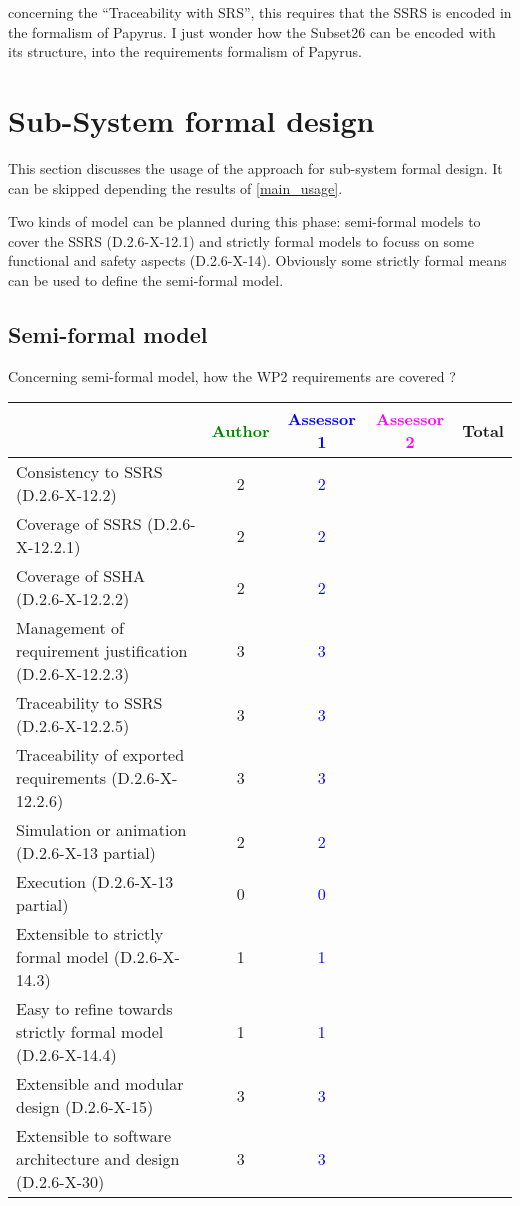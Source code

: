 \begin{assessor1}
concerning the "`Traceability with SRS"', this requires that the SSRS is encoded in the formalism of Papyrus. I just wonder how the Subset26 can be encoded with its structure, into the requirements formalism of Papyrus. 
\end{assessor1}

\section{Sub-System formal design}
This section discusses the usage of the approach for sub-system formal design.
It can be skipped depending the results of \ref{main_usage}.

Two kinds of model can be planned during this phase: semi-formal models to cover the SSRS (D.2.6-X-12.1) and strictly formal models to focuss on some functional and safety aspects (D.2.6-X-14). Obviously some strictly formal means can be used to define the semi-formal model.

\subsection{Semi-formal model}

Concerning semi-formal model, how the WP2 requirements are covered ?

\begin{tabular}{|l | c | c | c | c|}
\hline
& \textcolor{green}{Author} & \textcolor{blue}{Assessor 1} & \textcolor{magenta}{Assessor 2} & Total \\
\hline
Consistency to SSRS (D.2.6-X-12.2) & 2 & \textcolor{blue}{2} & & \\
\hline
Coverage of SSRS (D.2.6-X-12.2.1) & 2 & \textcolor{blue}{2} & & \\
\hline
Coverage of SSHA (D.2.6-X-12.2.2) & 2 & \textcolor{blue}{2} & & \\
\hline
Management of requirement justification (D.2.6-X-12.2.3) & 3 & \textcolor{blue}{3} & & \\
\hline
Traceability to SSRS (D.2.6-X-12.2.5) & 3 & \textcolor{blue}{3} & & \\
\hline
Traceability of exported requirements (D.2.6-X-12.2.6) & 3 & \textcolor{blue}{3} & & \\
\hline
Simulation or animation (D.2.6-X-13 partial) & 2 & \textcolor{blue}{2} & & \\
\hline
Execution (D.2.6-X-13 partial) & 0 & \textcolor{blue}{0} & & \\
\hline
Extensible to strictly formal model (D.2.6-X-14.3) & 1 & \textcolor{blue}{1} & & \\
\hline
Easy to refine towards strictly formal model (D.2.6-X-14.4) & 1 & \textcolor{blue}{1} & & \\
\hline
Extensible and modular design (D.2.6-X-15) & 3 & \textcolor{blue}{3} & & \\
\hline
Extensible to software architecture and design (D.2.6-X-30) & 3 & \textcolor{blue}{3} & & \\
\hline
\end{tabular}

